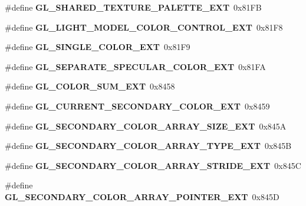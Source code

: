 \begin{DoxyCompactItemize}
\item 
\#define {\bfseries G\+L\+\_\+\+S\+H\+A\+R\+E\+D\+\_\+\+T\+E\+X\+T\+U\+R\+E\+\_\+\+P\+A\+L\+E\+T\+T\+E\+\_\+\+E\+X\+T}~0x81\+F\+B\label{_s_d_l__opengl_8h_a6346fed26c6ac240723e0f912185c1ba}

\item 
\#define {\bfseries G\+L\+\_\+\+L\+I\+G\+H\+T\+\_\+\+M\+O\+D\+E\+L\+\_\+\+C\+O\+L\+O\+R\+\_\+\+C\+O\+N\+T\+R\+O\+L\+\_\+\+E\+X\+T}~0x81\+F8\label{_s_d_l__opengl_8h_adcf51d551294f28f0355f8463bc9737f}

\item 
\#define {\bfseries G\+L\+\_\+\+S\+I\+N\+G\+L\+E\+\_\+\+C\+O\+L\+O\+R\+\_\+\+E\+X\+T}~0x81\+F9\label{_s_d_l__opengl_8h_a593e9aeddef6f33d4ecf78a61e2755e1}

\item 
\#define {\bfseries G\+L\+\_\+\+S\+E\+P\+A\+R\+A\+T\+E\+\_\+\+S\+P\+E\+C\+U\+L\+A\+R\+\_\+\+C\+O\+L\+O\+R\+\_\+\+E\+X\+T}~0x81\+F\+A\label{_s_d_l__opengl_8h_afd239a141295a983f2a440781cda4a57}

\item 
\#define {\bfseries G\+L\+\_\+\+C\+O\+L\+O\+R\+\_\+\+S\+U\+M\+\_\+\+E\+X\+T}~0x8458\label{_s_d_l__opengl_8h_ab18fd48738fff07d744dbcc6920464b4}

\item 
\#define {\bfseries G\+L\+\_\+\+C\+U\+R\+R\+E\+N\+T\+\_\+\+S\+E\+C\+O\+N\+D\+A\+R\+Y\+\_\+\+C\+O\+L\+O\+R\+\_\+\+E\+X\+T}~0x8459\label{_s_d_l__opengl_8h_a37dae0589d187e435151edb58b6ef813}

\item 
\#define {\bfseries G\+L\+\_\+\+S\+E\+C\+O\+N\+D\+A\+R\+Y\+\_\+\+C\+O\+L\+O\+R\+\_\+\+A\+R\+R\+A\+Y\+\_\+\+S\+I\+Z\+E\+\_\+\+E\+X\+T}~0x845\+A\label{_s_d_l__opengl_8h_a085c2d30ca3ae534f507e70ed9d890ed}

\item 
\#define {\bfseries G\+L\+\_\+\+S\+E\+C\+O\+N\+D\+A\+R\+Y\+\_\+\+C\+O\+L\+O\+R\+\_\+\+A\+R\+R\+A\+Y\+\_\+\+T\+Y\+P\+E\+\_\+\+E\+X\+T}~0x845\+B\label{_s_d_l__opengl_8h_add02ad61bdb6dc5b806a87589b9a9ba3}

\item 
\#define {\bfseries G\+L\+\_\+\+S\+E\+C\+O\+N\+D\+A\+R\+Y\+\_\+\+C\+O\+L\+O\+R\+\_\+\+A\+R\+R\+A\+Y\+\_\+\+S\+T\+R\+I\+D\+E\+\_\+\+E\+X\+T}~0x845\+C\label{_s_d_l__opengl_8h_a6240ac627c340d7c4f912734a301be73}

\item 
\#define {\bfseries G\+L\+\_\+\+S\+E\+C\+O\+N\+D\+A\+R\+Y\+\_\+\+C\+O\+L\+O\+R\+\_\+\+A\+R\+R\+A\+Y\+\_\+\+P\+O\+I\+N\+T\+E\+R\+\_\+\+E\+X\+T}~0x845\+D\label{_s_d_l__opengl_8h_a997871c1859e7d7719db28effdd3faeb}


\end{DoxyCompactItemize}
